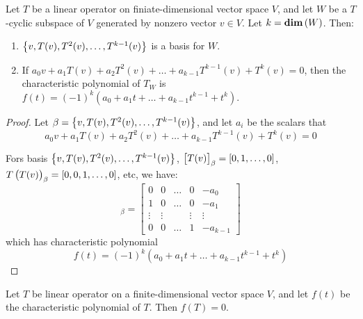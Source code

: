 \begin{theorem}
    Let $T$ be a linear operator on finiate-dimensional vector space $V$, and let $W$ be a $T$-cyclic subspace of $V$ generated by nonzero vector $v \in V$. Let $k = \displaystyle \mathbf{dim}\left( W \right)$. Then:
    \begin{enumerate}
        \item $\set{v, T(v), T^2(v), \dots, T^{k-1}(v)}$ is a basis for $W$.
        \item If $a_0 v + a_1 T(v) + a_2 T^2(v) + \dots + a_{k-1} T^{k-1}(v) + T^k(v) = 0$, then the characteristic polynomial of $T_W$ is $f(t) = (-1)^k \left( a_0 + a_1 t + \dots + a_{k-1} t^{k-1} + t^k \right)$.
    \end{enumerate}
\end{theorem}

\begin{proof}
    Let $\beta = \set{v, T(v), T^2(v), \dots, T^{k-1}(v)}$, and let $a_i$ be the scalars that 
    \begin{equation*}
            a_0 v + a_1 T(v) + a_2 T^2(v) + \dots + a_{k-1} T^{k-1}(v) + T^k(v) = 0
    \end{equation*}
    
    Fors basis $\set{v, T(v), T^2(v), \dots, T^{k-1}(v)}$, $\coordinate{T(v)}_\beta = \coordinate{0,1,\dots, 0}$, $T\left( T(v)\right)_\beta = \coordinate{0,0,1,\dots, 0}$, etc, we have:
    \begin{equation*}
        [T_W]_\beta = \begin{bmatrix}
            0 & 0 & \dots & 0 & - a_0 \\
            1 & 0 & \dots & 0 & -a_1\\
            \vdots & \vdots  & & \vdots & \vdots \\
            0 & 0 & \dots & 1 & - a_{k-1}
        \end{bmatrix}
    \end{equation*}
    which has characteristic polynomial
    \begin{equation*}
        f(t) = (-1)^k (a_0 + a_1 t + \dots + a_{k-1} t^{k-1} + t^k)
    \end{equation*}
\end{proof}

\begin{theorem}
    Let $T$ be linear operator on a finite-dimensional vector space $V$, and let $f(t)$ be the characteristic polynomial of $T$. Then $f(T) = 0$.
\end{theorem}

